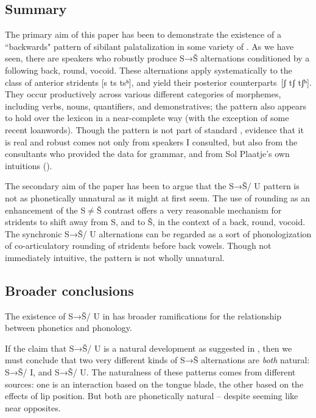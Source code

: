 \subsection{Summary}\label{sec:bennett:5.1}

The primary aim of this paper has been to demonstrate the existence of a ``backwards" pattern of sibilant palatalization in some variety of . As we have seen, there are speakers who robustly produce S→Š alternations conditioned by a following back, round, vocoid. These alternations apply systematically to the class of anterior stridents [s ts tsʰ], and yield their posterior counterparts\linebreak\ [ʃ tʃ tʃʰ]. They occur productively across various different categories of morphemes, including verbs, nouns, quantifiers, and demonstratives; the pattern also appears to hold over the lexicon in a near-complete way (with the exception of some recent loanwords). Though the pattern is not part of standard , evidence that it is real and robust comes not only from speakers I consulted, but also from the consultants who provided the data for  grammar, and from Sol Plaatje’s own intuitions (\citealt{Jones&Plaatje1916}).

The secondary aim of the paper has been to argue that the S→Š/ {\longrule} U pattern is not as phonetically unnatural as it might at first seem. The use of rounding as an enhancement of the S${\neq}$Š contrast offers a very reasonable mechanism for stridents to shift away from S, and to Š, in the context of a back, round, vocoid. The synchronic S→Š/ {\longrule} U alternations can be regarded as a sort of phonologization of co-articulatory rounding of stridents before back vowels. Though not immediately intuitive, the pattern is not wholly unnatural.

\subsection{Broader conclusions}\label{sec:bennett:5.2}

The existence of S→Š/ {\longrule} U in  has broader ramifications for the relationship between phonetics and phonology. 

If the claim that S→Š/ {\longrule} U is a natural development as suggested in , then we must conclude that two very different kinds of S→Š alternations are \textit{both} natural: S→Š/ {\longrule} I, and S→Š/ {\longrule} U. The naturalness of these patterns comes from different sources: one is an interaction based on the tongue blade, the other based on the effects of lip position. But both are phonetically natural – despite seeming like near opposites. 

